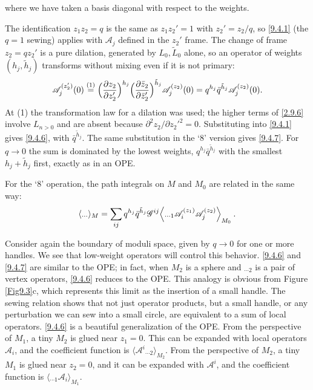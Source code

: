 where we have taken a basis diagonal with respect to the weights.
\begin{tcolorbox}[breakable]
	\begin{remark}
		The identification $z_1z_2=q$ is the same as $z_1z_2'=1$ with $z_2'=z_2/q$, so \eqref{9.4.1} (the $q=1$ sewing) applies with $\mathscr A_j$ defined in the $z_2'$ frame. The change of frame $z_2=qz_2'$ is a pure dilation, generated by $L_0,\tilde L_0$ alone, so an operator of weights $(h_j,\tilde h_j)$ transforms without mixing even if it is not primary:
		\begin{equation*}
			\mathscr A_j^{(z_2')}(0)\overset{(1)}{=}\Bigl(\frac{\partial z_2}{\partial z_2'}\Bigr)^{h_j}\Bigl(\frac{\partial\bar z_2}{\partial\bar z_2'}\Bigr)^{\tilde h_j}\mathscr A_j^{(z_2)}(0)=q^{h_j}\bar q^{\tilde h_j}\mathscr A_j^{(z_2)}(0).
		\end{equation*}
		At (1) the transformation law for a dilation was used; the higher terms of \eqref{2.9.6} involve $L_{n>0}$ and are absent because $\partial^2z_2/\partial z_2'^2=0$. Substituting into \eqref{9.4.1} gives \eqref{9.4.6}, with $\bar q^{\tilde h_j}$. The same substitution in the `8' version gives \eqref{9.4.7}. For $q\to0$ the sum is dominated by the lowest weights, $q^{h_j}\bar q^{\tilde h_j}$ with the smallest $h_j+\tilde h_j$ first, exactly as in an OPE.
	\end{remark}
\end{tcolorbox}
For the `8' operation, the path integrals on $M$ and $M_{0}$ are related in the same way:
\begin{equation}
	\langle {}_{\cdots}\rangle_{M}=\sum_{i j} q^{h_{j}} \bar{q}^{\tilde{h}_{j}} \mathscr{G}^{ij} 
	\Bigl\langle {}_{\cdots 1} \mathscr{A}_{i}^{(z_{1})} \mathscr{A}_{j}^{(z_{2})}\Bigr\rangle_{M_{0}} \:. \label{9.4.7}
\end{equation}

Consider again the boundary of moduli space, given by $q \rightarrow 0$ for one or more handles. We see that low-weight operators will control this behavior.
\eqref{9.4.6} and \eqref{9.4.7} are similar to the OPE; in fact, when $M_{2}$ is a sphere and ${}_{\cdots 2}$ is a pair of vertex operators, \eqref{9.4.6} reduces to the OPE. 
This analogy is obvious from Figure \ref{Fig9.3}c, which represents this limit as the insertion of a small handle. The sewing relation shows that not just operator products, but a small handle, or any perturbation we can sew into a small circle, 
are equivalent to a sum of local operators. \eqref{9.4.6} is a beautiful generalization of the OPE.
From the perspective of $M_{1}$, a tiny $M_{2}$ is glued near $z_{1}=0$. 
This can be expanded with local operators $\mathscr{A}_{i}$, and the coefficient function is $\langle\mathscr{A}^{i} {}_{\cdots 2}\rangle_{M_{2}}$.
From the perspective of $M_{2}$, a tiny $M_{1}$ is glued near $z_{2}=0$, and it can be expanded with $\mathscr{A}^{i}$, 
and the coefficient function is $\langle {}_{\cdots 1} \mathscr{A}_{i}\rangle_{M_{1}}$.

